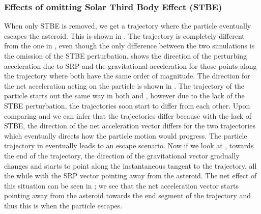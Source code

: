 \subsubsection{Effects of omitting Solar Third Body Effect (STBE)}
When only \gls{STBE} is removed, we get a trajectory where the particle eventually escapes the asteroid. This is shown in . The trajectory is completely different from the one in , even though the only difference between the two simulations is the omission of the \gls{STBE} perturbation.  shows the direction of the perturbing acceleration due to \gls{SRP} and the gravitational acceleration for those points along the trajectory where both have the same order of magnitude. The direction for the net acceleration acting on the particle is shown in . The trajectory of the particle starts out the same way in both  and , however due to the lack of the \gls{STBE} perturbation, the trajectories soon start to differ from each other. Upon comparing  and  we can infer that the trajectories differ because with the lack of \gls{STBE}, the direction of the net acceleration vector differs for the two trajectories which eventually directs how the particle motion would progress. The particle trajectory in  eventually leads to an escape scenario. Now if we look at , towards the end of the trajectory, the direction of the gravitational vector gradually changes and starts to point along the instantaneous tangent to the trajectory, all the while with the \gls{SRP} vector pointing away from the asteroid. The net effect of this situation can be seen in ; we see that the net acceleration vector starts pointing away from the asteroid towards the end segment of the trajectory and thus this is when the particle escapes.
